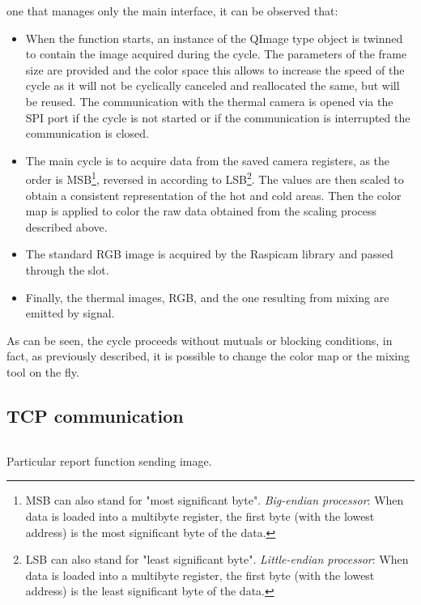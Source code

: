 one that manages only the main interface, it can be observed that:
\begin{itemize}
\item When the function starts, an instance of the QImage type object is
twinned to contain the image acquired during the cycle. The parameters of the
frame size are provided and the color space this allows to increase the speed of
the cycle as it will not be cyclically canceled and reallocated the same, but
will be reused. The communication with the thermal camera is opened via the SPI
port if the cycle is not started or if the communication is interrupted the
communication is closed.
\item The main cycle is to acquire data from the saved camera registers, as the
order is MSB\footnote{MSB can also stand for "most significant byte".
\emph{Big-endian processor}: When data is loaded into a multibyte register, the
first byte (with the lowest address) is the most significant byte of the
data.\cite{56322}}, reversed in according to LSB\footnote{LSB can also stand
for "least significant byte". \emph{Little-endian processor}: When data is
loaded into a multibyte register, the first byte (with the lowest address) is
the least significant byte of the data.\cite{56322}}. The values are then scaled
to obtain a consistent representation of the hot and cold areas. Then the color
map is applied to color the raw data obtained from the scaling process described
above.
\item The standard RGB image is acquired by the Raspicam library and passed
through the slot.
\item Finally, the thermal images, RGB, and the one resulting from mixing are
emitted by signal.
\end{itemize}
%
As can be seen, the cycle proceeds without mutuals or blocking conditions, in
fact, as previously described, it is possible to change the color map or the
mixing tool on the fly.
%
\subsection{TCP communication}
\label{ssec:software-TCPSocket}

\begin{listing}[ht] 
\inputminted[bgcolor=bg,frame=lines,framesep=2mm, linenos=true, autogobble, breaklines=true, fontsize=\scriptsize]{c++}{software/code/mainwindow.cpp} 
\caption{Particular report function sending image.} 
\label{lst:rasp-code-thread} 
\end{listing}
%
%

